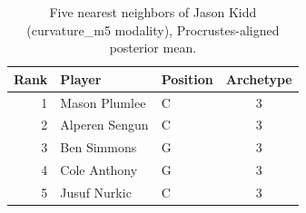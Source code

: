\begin{table}[htbp]
  \centering\small
  \begin{tabular}{rllc}
    \toprule
    Rank & Player & Position & Archetype \\
    \midrule
    1 & Mason Plumlee & C & 3 \\
    2 & Alperen Sengun & C & 3 \\
    3 & Ben Simmons & G & 3 \\
    4 & Cole Anthony & G & 3 \\
    5 & Jusuf Nurkic & C & 3 \\
    \bottomrule
  \end{tabular}
  \caption{Five nearest neighbors of Jason Kidd (curvature_m5 modality), Procrustes-aligned posterior mean.}
  \label{tab:Jason_Kidd_neighbors_curvature_m5}
\end{table}

